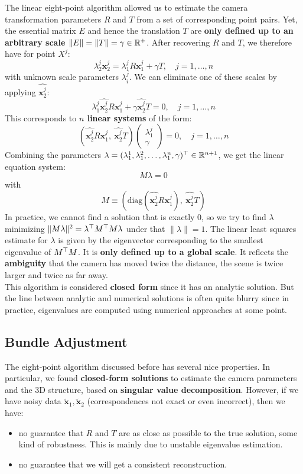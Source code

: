 The linear eight-point algorithm allowed us to estimate the camera transformation
parameters $R$ and $T$ from a set of corresponding point pairs.
Yet, the essential matrix $E$ and hence the translation $T$ are
\textbf{only defined up to an arbitrary scale $\|E\| = \|T\| = \gamma \in \mathbb{R}^+$}.
After recovering $R$ and $T$, we therefore have for point $X^j$:
\[
	\lambda_2^j \bm{x}_2^j
		= \lambda_1^j R \bm{x}_1^j + \gamma T,
		\quad j = 1, \ldots, n
\]
with unknown scale parameters $\lambda_i^j$.
We can eliminate one of these scales by applying $\widehat{ \bm{x}_2^j }$:
\[
	\lambda_1^j \widehat{ \bm{x}_2^j }R \bm{x}_1^j
		+ \gamma \widehat{ \bm{x}_2^j }T
		= 0, \quad j = 1, \ldots, n
\]
This corresponds to \textbf{$n$ linear systems} of the form:
\[
	\left( \widehat{ \bm{x}_2^j }R \bm{x}_1^j
		,\ \widehat{ \bm{x}_2^j }T
	\right)
	\begin{pmatrix}
		\lambda_1^j \\ \gamma
	\end{pmatrix}
	= 0, \quad j = 1, \ldots, n
\]
Combining the parameters
$\lambda = (\lambda_1^1, \lambda_1^2, \ldots, \lambda_1^n, \gamma)^{\top} \in \mathbb{R}^{n+1}$,
we get the linear equation system:
\[
	\boxed{ M \lambda = 0 }
\]
with
\[
	M \equiv \left( \text{diag}(\widehat{\bm{x}_2^j} R \bm{x}_1^j)
	,\ \widehat{\bm{x}_2^j} T \right)
\]
In practice, we cannot find a solution that is exactly 0,
so we try to find $\lambda$ minimizing 
$\|M\lambda\|^2 = \lambda^{\top} M^{\top} M \lambda $ under that
$\| \lambda \| = 1$.
The linear least squares estimate for $\lambda$ is given by the eigenvector
corresponding to the smallest eigenvalue of $M^{\top}M$.
It is \textbf{only defined up to a global scale}. It reflects the
\textbf{ambiguity} that the camera has moved twice the distance,
the scene is twice larger and twice as far away.\\

This algorithm is considered \textbf{closed form} since it has an
analytic solution. But the line between analytic and numerical
solutions is often quite blurry since in practice,
eigenvalues are computed using numerical approaches at some point.


\subsection{Bundle Adjustment}%
\label{sub:bundle_adjustment}


The eight-point algorithm discussed before has several nice properties.
In particular, we found \textbf{closed-form solutions} to estimate the camera
parameters and the 3D structure, based on \textbf{singular value decomposition}.
However, if we have noisy data $\bm{\tilde{x}}_1, \bm{\tilde{x}}_2$
(correspondences not exact or even incorrect), then we have:
\begin{itemize}
	\item no guarantee that $R$ and $T$ are as close as possible
		to the true solution, some kind of robustness.
		This is mainly due to unstable eigenvalue estimation.
	\item no guarantee that we will get a consistent reconstruction.
\end{itemize}


